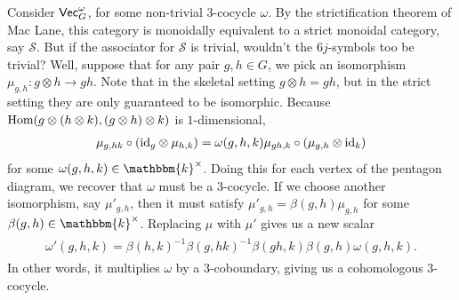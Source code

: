 \noindent Consider $\textup{\textsf{Vec}}_G^\omega$, for some non-trivial $3$-cocycle $\omega$. By the strictification theorem of Mac Lane, this category is monoidally equivalent to a strict monoidal category, say $\mathcal{S}$. But if the associator for $\mathcal{S}$ is trivial, wouldn't the $6j$-symbols too be trivial? Well, suppose that for any pair $g, h \in G$, we pick an isomorphism $\mu_{g,h} : g \otimes h \to gh$. Note that in the skeletal setting $g \otimes h = gh$, but in the strict setting they are only guaranteed to be isomorphic. Because $\textup{Hom}(g \otimes (h \otimes k), (g \otimes h) \otimes k)$ is $1$-dimensional,
\begin{align*}
\begin{split}
\mu_{g,hk} \circ (\textup{id}_g \otimes \mu_{h,k}) = \omega(g, h, k) \mu_{gh,k} \circ (\mu_{g,h} \otimes \textup{id}_k)
\end{split}
\end{align*}
\noindent for some $\omega(g, h, k) \in \mathbbm{k}^\times$. Doing this for each vertex of the pentagon diagram, we recover that $\omega$ must be a $3$-cocycle. If we choose another isomorphism, say $\mu'_{g,h}$, then it must satisfy $\mu'_{g,h} = \beta(g,h)\mu_{g,h}$ for some $\beta(g, h) \in \mathbbm{k}^\times$. Replacing $\mu$ with $\mu'$ gives us a new scalar
\begin{align*}
\begin{split}
\omega'(g, h, k) = \beta(h, k)^{-1}\beta(g, hk)^{-1}\beta(gh, k)\beta(g, h)\omega(g, h, k).
\end{split}
\end{align*}
\noindent In other words, it multiplies $\omega$ by a $3$-coboundary, giving us a cohomologous $3$-cocycle.
\newpage


